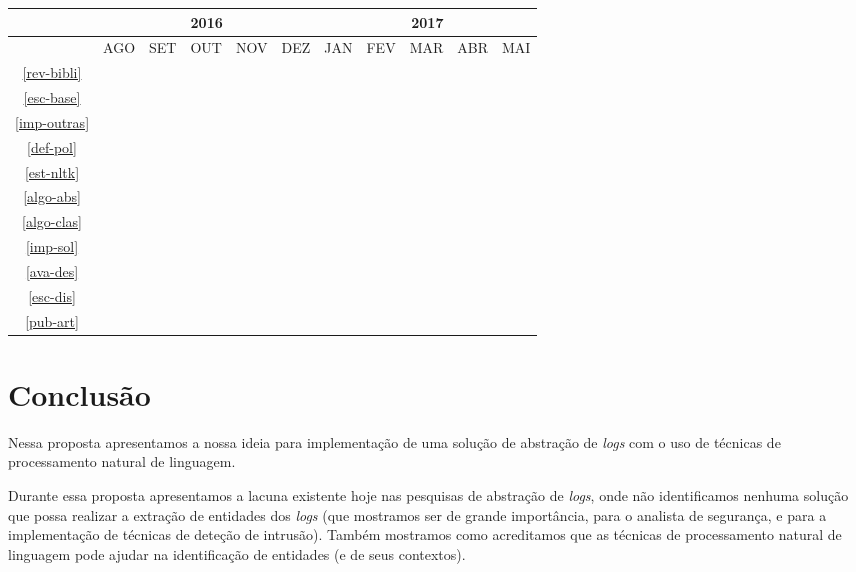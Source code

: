 \documentclass[
	12pt,				%
	openright,			%
	twoside,			%
	a4paper,			%
	english,			%
	spanish,			%
	brazil,				%
	]{abntex2}
\begin{document}
\begin{table}[!htbp]
	\centering
	\begin{tabular}{|c|c|c|c|c|c|c|c|c|c|c|}
		\hline
		&\multicolumn{5}{c|}{2016}&\multicolumn{5}{c|}{2017}\\
		\hline
		&AGO&SET&OUT&NOV&DEZ&JAN&FEV&MAR&ABR&MAI\\
		\hline
		\ref{rev-bibli}& \textbullet & \textbullet & \textbullet & \textbullet & \textbullet & \textbullet & \textbullet & \textbullet & \textbullet & \textbullet \\
		\hline
		\ref{esc-base}& \textbullet & \textbullet &&&&&&&&\\
		\hline
		\ref{imp-outras}& \textbullet &\textbullet & \textbullet &&&&&&&\\
		\hline
		\ref{def-pol}& &&&\textbullet &\textbullet &&&&&\\
		\hline
		\ref{est-nltk}&&\textbullet &\textbullet &\textbullet &\textbullet &&&&&\\
		\hline
		\ref{algo-abs}& &&\textbullet&\textbullet&\textbullet&&&&&\\
		\hline
		\ref{algo-clas}& &&&\textbullet&\textbullet&\textbullet&\textbullet&&&\\
		\hline
		\ref{imp-sol}&&&&&&\textbullet&\textbullet&\textbullet&&\\
		\hline
		\ref{ava-des}&&&&&&&\textbullet&\textbullet&\textbullet&\textbullet\\
		\hline
		\ref{esc-dis}&&&&&&\textbullet&\textbullet&\textbullet&\textbullet&\textbullet\\
		\hline				
		\ref{pub-art}& & & & & \textbullet & & & & & \textbullet \\
		\hline					
	\end{tabular}
\end{table}

\chapter{Conclusão}\label{chap:conclusao}
Nessa proposta apresentamos a nossa ideia para implementação de uma solução de abstração de \emph{logs} com o uso de técnicas de processamento natural de linguagem.

Durante essa proposta apresentamos a lacuna existente hoje nas pesquisas de abstração de \emph{logs}, onde não identificamos nenhuma solução que possa realizar a extração de entidades dos \emph{logs} (que mostramos ser de grande importância, para o analista de segurança, e para a implementação de técnicas de deteção de intrusão). Também mostramos como acreditamos que as técnicas de processamento natural de linguagem pode ajudar na identificação de entidades (e de seus contextos).
\end{document}
